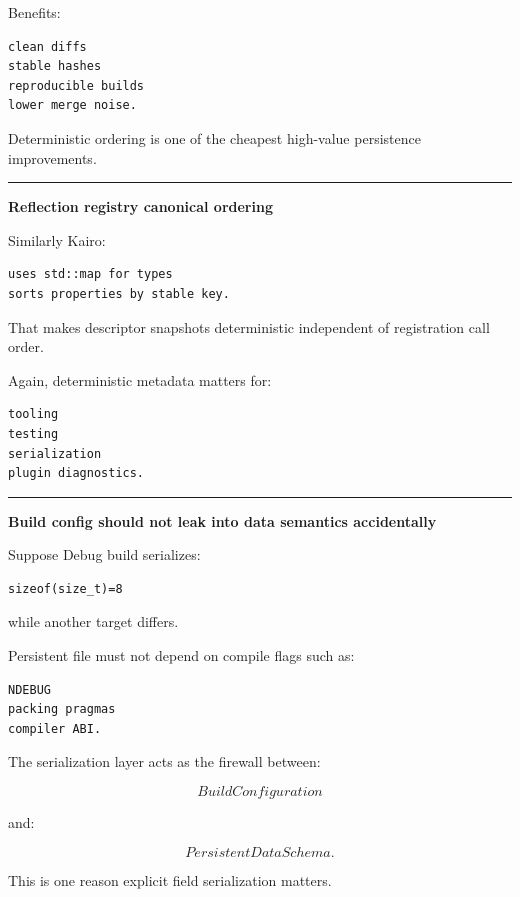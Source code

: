 Benefits:

\begin{verbatim}
clean diffs
stable hashes
reproducible builds
lower merge noise.
\end{verbatim}

Deterministic ordering is one of the cheapest high-value persistence improvements.

\begin{center}\rule{0.5\linewidth}{0.5pt}\end{center}

\textbf{Reflection registry canonical ordering}

Similarly Kairo:

\begin{verbatim}
uses std::map for types
sorts properties by stable key.
\end{verbatim}

That makes descriptor snapshots deterministic independent of registration call order.

Again, deterministic metadata matters for:

\begin{verbatim}
tooling
testing
serialization
plugin diagnostics.
\end{verbatim}

\begin{center}\rule{0.5\linewidth}{0.5pt}\end{center}

\textbf{Build config should not leak into data semantics accidentally}

Suppose Debug build serializes:

\begin{verbatim}
sizeof(size_t)=8
\end{verbatim}

while another target differs.

Persistent file must not depend on compile flags such as:

\begin{verbatim}
NDEBUG
packing pragmas
compiler ABI.
\end{verbatim}

The serialization layer acts as the firewall between:

\[
BuildConfiguration
\]

and:

\[
PersistentDataSchema.
\]

This is one reason explicit field serialization matters.

